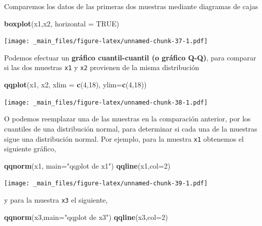 \documentclass[
]{book}
\newenvironment{Shaded}{\begin{snugshade}}{\end{snugshade}}
\newcommand{\AttributeTok}[1]{\textcolor[rgb]{0.13,0.29,0.53}{#1}}
\newcommand{\ConstantTok}[1]{\textcolor[rgb]{0.56,0.35,0.01}{#1}}
\newcommand{\DecValTok}[1]{\textcolor[rgb]{0.00,0.00,0.81}{#1}}
\newcommand{\FunctionTok}[1]{\textcolor[rgb]{0.13,0.29,0.53}{\textbf{#1}}}
\newcommand{\NormalTok}[1]{#1}
\newcommand{\StringTok}[1]{\textcolor[rgb]{0.31,0.60,0.02}{#1}}
\begin{document}
Comparemos los datos de las primeras dos muestras mediante diagramas de cajas

\begin{Shaded}
\begin{Highlighting}[]
\FunctionTok{boxplot}\NormalTok{(x1,x2, }\AttributeTok{horizontal =} \ConstantTok{TRUE}\NormalTok{)}
\end{Highlighting}
\end{Shaded}

\texttt{[image: \_main\_files/figure-latex/unnamed-chunk-37-1.pdf]}

Podemos efectuar un \textbf{gráfico cuantil-cuantil (o gráfico Q-Q)}, para comparar si las dos muestras \texttt{x1} y \texttt{x2} provienen de la misma distribución

\begin{Shaded}
\begin{Highlighting}[]
\FunctionTok{qqplot}\NormalTok{(x1, x2, }\AttributeTok{xlim =} \FunctionTok{c}\NormalTok{(}\DecValTok{4}\NormalTok{,}\DecValTok{18}\NormalTok{), }\AttributeTok{ylim=}\FunctionTok{c}\NormalTok{(}\DecValTok{4}\NormalTok{,}\DecValTok{18}\NormalTok{))}
\end{Highlighting}
\end{Shaded}

\texttt{[image: \_main\_files/figure-latex/unnamed-chunk-38-1.pdf]}

O podemos reemplazar una de las muestras en la comparación anterior, por los cuantiles de una distribución normal, para determinar si cada una de la muestras sigue una distribución normal. Por ejemplo, para la muestra \texttt{x1} obtenemos el siguiente gráfico,

\begin{Shaded}
\begin{Highlighting}[]
\FunctionTok{qqnorm}\NormalTok{(x1, }\AttributeTok{main=}\StringTok{"qqplot de x1"}\NormalTok{)}
\FunctionTok{qqline}\NormalTok{(x1,}\AttributeTok{col=}\DecValTok{2}\NormalTok{)}
\end{Highlighting}
\end{Shaded}

\texttt{[image: \_main\_files/figure-latex/unnamed-chunk-39-1.pdf]}

y para la muestra \texttt{x3} el siguiente,

\begin{Shaded}
\begin{Highlighting}[]
\FunctionTok{qqnorm}\NormalTok{(x3,}\AttributeTok{main=}\StringTok{"qqplot de x3"}\NormalTok{)}
\FunctionTok{qqline}\NormalTok{(x3,}\AttributeTok{col=}\DecValTok{2}\NormalTok{)}
\end{Highlighting}
\end{Shaded}
\end{document}
